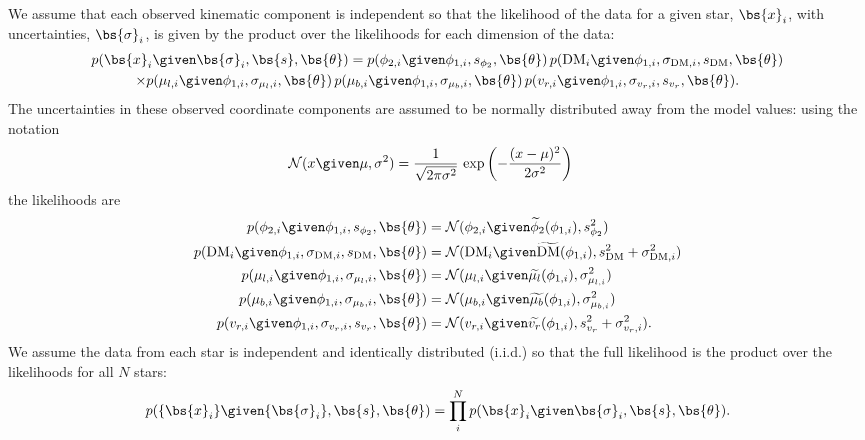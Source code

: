 \documentclass[letterpaper,12pt,preprint]{aastex}
\newcommand{\DM}{{\rm DM}}
\newcommand{\norm}{\mathcal{N}}
\begin{document}
We assume that each observed kinematic component is independent so that the likelihood of the data for a given star, $\bs{x}_i$, with uncertainties, $\bs{\sigma}_i$, is given by the product over the likelihoods for each dimension of the data:
\begin{multline}
	p(\bs{x}_i \given \bs{\sigma}_i, \bs{s}, \bs{\theta}) = p(\phi_{2,i} \given \phi_{1,i}, s_{\phi_2},\bs{\theta}) \, p(\DM_i \given \phi_{1,i}, \sigma_{\DM,i}, s_\DM, \bs{\theta})\\ 
	\times p(\mu_{l,i} \given \phi_{1,i}, \sigma_{\mu_{l},i}, \bs{\theta}) \, p(\mu_{b,i} \given \phi_{1,i}, \sigma_{\mu_{b},i}, \bs{\theta}) \, p(v_{r,i} \given \phi_{1,i}, \sigma_{v_r,i}, s_{v_r}, \bs{\theta}).
\end{multline}
The uncertainties in these observed coordinate components are assumed to be normally distributed away from the model values: using the notation
\begin{align}
	\norm(x \given \mu, \sigma^2) &= \frac{1}{\sqrt{2\pi \sigma^2}} \, \exp\left(-\frac{(x-\mu)^2}{2\sigma^2}\right)
\end{align}
the likelihoods are
\begin{align}	
	p(\phi_{2,i} \given \phi_{1,i}, s_{\phi_2},\bs{\theta}) &= \norm(\phi_{2,i} \given \widetilde{\phi}_{2}(\phi_{1,i}), s^2_{\phi_2})\\
	p(\DM_i \given \phi_{1,i}, \sigma_{\DM,i}, s_\DM, \bs{\theta}) &= \norm(\DM_i \given \widetilde{\DM}(\phi_{1,i}), s^2_{\DM} + \sigma^2_{\DM,i})\\
	p(\mu_{l,i} \given \phi_{1,i}, \sigma_{\mu_{l},i}, \bs{\theta}) &= \norm(\mu_{l,i} \given \widetilde{\mu_{l}}(\phi_{1,i}), \sigma^2_{\mu_{l,i}})\\
	p(\mu_{b,i} \given \phi_{1,i}, \sigma_{\mu_{b},i}, \bs{\theta}) &= \norm(\mu_{b,i} \given \widetilde{\mu_{b}}(\phi_{1,i}), \sigma^2_{\mu_{b,i}})\\
	p(v_{r,i} \given \phi_{1,i}, \sigma_{v_r,i}, s_{v_r}, \bs{\theta}) &= \norm(v_{r,i} \given \widetilde{v_r}(\phi_{1,i}), s^2_{v_r} + \sigma^2_{v_r,i}).
\end{align}
We assume the data from each star is independent and identically distributed (i.i.d.) so that the full likelihood is the product over the likelihoods for all $N$ stars:
\begin{equation}
	 p(\{\bs{x}_i\} \given \{\bs{\sigma}_i\}, \bs{s}, \bs{\theta}) = \prod_i^N p(\bs{x}_i \given \bs{\sigma}_i, \bs{s}, \bs{\theta}).\label{eq:likelihood}
\end{equation}
\end{document}
